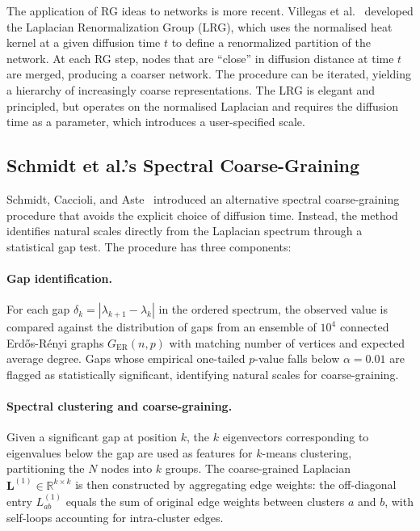 The application of RG ideas to networks is more recent.  Villegas et
al.~\cite{villegas2023laplacian} developed the Laplacian Renormalization
Group (LRG), which uses the normalised heat kernel at a given diffusion
time $t$ to define a renormalized partition of the network.  At each RG
step, nodes that are ``close'' in diffusion distance at time $t$ are
merged, producing a coarser network.  The procedure can be iterated,
yielding a hierarchy of increasingly coarse representations.  The LRG
is elegant and principled, but operates on the normalised Laplacian and
requires the diffusion time as a parameter, which introduces a
user-specified scale.

\subsection{Schmidt et al.'s Spectral Coarse-Graining}
\label{sec:schmidt_method}

Schmidt, Caccioli, and Aste~\cite{schmidt2024spectral} introduced an
alternative spectral coarse-graining procedure that avoids the
explicit choice of diffusion time.  Instead, the method identifies
natural scales directly from the Laplacian spectrum through a
statistical gap test.  The procedure has three components:

\paragraph{Gap identification.}  For each gap
$\delta_k = |\lambda_{k+1} - \lambda_k|$ in the ordered spectrum,
the observed value is compared against the distribution of gaps from
an ensemble of $10^4$ connected Erd\H{o}s-R\'enyi graphs
$G_{\text{ER}}(n,p)$ with matching number of vertices and expected
average degree.  Gaps whose empirical one-tailed $p$-value falls below
$\alpha = 0.01$ are flagged as statistically significant, identifying
natural scales for coarse-graining.

\paragraph{Spectral clustering and coarse-graining.}  Given a
significant gap at position $k$, the $k$ eigenvectors corresponding
to eigenvalues below the gap are used as features for $k$-means
clustering, partitioning the $N$ nodes into $k$ groups.  The
coarse-grained Laplacian $\mathbf{L}^{(1)} \in \mathbb{R}^{k \times k}$
is then constructed by aggregating edge weights: the off-diagonal
entry $L^{(1)}_{ab}$ equals the sum of original edge weights between
clusters $a$ and $b$, with self-loops accounting for intra-cluster
edges.


